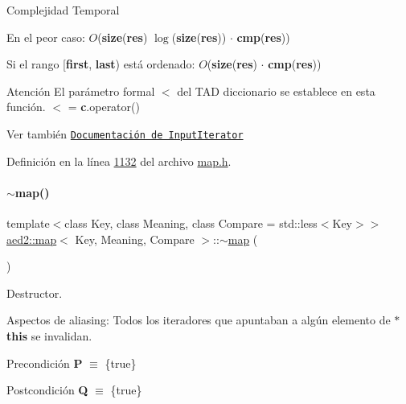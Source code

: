 \begin{DoxyDescription}
\item[Complejidad Temporal]
\begin{DoxyItemize}
\item En el peor caso\+: $O$({\bfseries size}({\bfseries res}) $\log$({\bfseries size}({\bfseries res})) $\cdot$ {\bfseries cmp}({\bfseries res}))
\item Si el rango \mbox{[}{\bfseries first}, {\bfseries last}) está ordenado\+: $O$({\bfseries size}({\bfseries res}) $\cdot$ {\bfseries cmp}({\bfseries res})) 
\end{DoxyItemize}
\end{DoxyDescription}

\begin{DoxyAttention}{Atención}
El parámetro formal $<$ del T\+AD diccionario se establece en esta función. $<$ = {\bfseries c}.operator()
\end{DoxyAttention}
\begin{DoxySeeAlso}{Ver también}
\href{http://en.cppreference.com/w/cpp/concept/InputIterator}{\tt Documentación de Input\+Iterator} 
\end{DoxySeeAlso}


Definición en la línea \hyperlink{map_8h_source_l01132}{1132} del archivo \hyperlink{map_8h_source}{map.\+h}.

\mbox{\label{classaed2_1_1map_ab22c9a85c2dadbc286cd30e97069a8e6_ab22c9a85c2dadbc286cd30e97069a8e6}} 
\paragraph{\texorpdfstring{$\sim$map()}{~map()}}
{\footnotesize\ttfamily template$<$class Key, class Meaning, class Compare = std\+::less$<$\+Key$>$$>$ \\
\hyperlink{classaed2_1_1map}{aed2\+::map}$<$ Key, Meaning, Compare $>$\+::$\sim$\hyperlink{classaed2_1_1map}{map} (\begin{DoxyParamCaption}{ }\end{DoxyParamCaption})\hspace{0.3cm}{\ttfamily [inline]}}



Destructor. 

\begin{DoxyParagraph}{Aspectos de aliasing\+:}
Todos los iteradores que apuntaban a algún elemento de {\bfseries $\ast$this} se invalidan.
\end{DoxyParagraph}
\begin{DoxyPrecond}{Precondición}
{\bfseries P} $\equiv$ \{true\} 
\end{DoxyPrecond}
\begin{DoxyPostcond}{Postcondición}
{\bfseries Q} $\equiv$ \{true\}
\end{DoxyPostcond}

